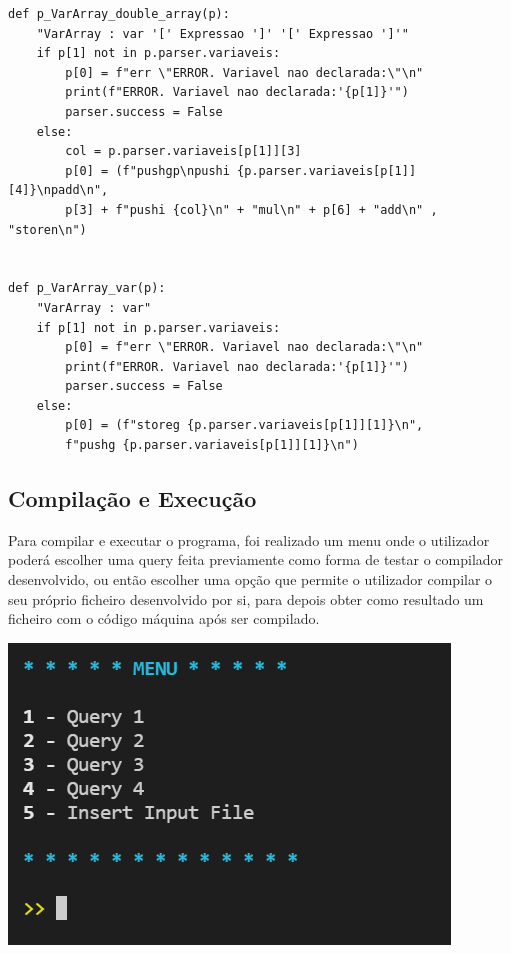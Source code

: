 \documentclass[11pt,a4paper]{report}
\begin{document}
\begin{itemize}
\begin {verbatim}
def p_VarArray_double_array(p):
    "VarArray : var '[' Expressao ']' '[' Expressao ']'"
    if p[1] not in p.parser.variaveis:
        p[0] = f"err \"ERROR. Variavel nao declarada:\"\n"
        print(f"ERROR. Variavel nao declarada:'{p[1]}'")
        parser.success = False
    else:
        col = p.parser.variaveis[p[1]][3]
        p[0] = (f"pushgp\npushi {p.parser.variaveis[p[1]][4]}\npadd\n", 
		p[3] + f"pushi {col}\n" + "mul\n" + p[6] + "add\n" , "storen\n")


def p_VarArray_var(p):
    "VarArray : var"
    if p[1] not in p.parser.variaveis:
        p[0] = f"err \"ERROR. Variavel nao declarada:\"\n"
        print(f"ERROR. Variavel nao declarada:'{p[1]}'")
        parser.success = False
    else:
        p[0] = (f"storeg {p.parser.variaveis[p[1]][1]}\n",
		f"pushg {p.parser.variaveis[p[1]][1]}\n")
\end{verbatim}

\end{itemize}


\subsection{Compilação e Execução}

\qquad Para compilar e executar o programa, foi realizado um menu onde o utilizador poderá escolher uma query feita previamente como forma de testar o compilador desenvolvido, ou então escolher uma opção que permite o utilizador compilar o seu próprio ficheiro desenvolvido por si, para depois obter como resultado um ficheiro com o código máquina após ser compilado.

	\begin{center}
	\includegraphics[scale=0.85]{images/menu}
	\end{center}
	
\end{document}
